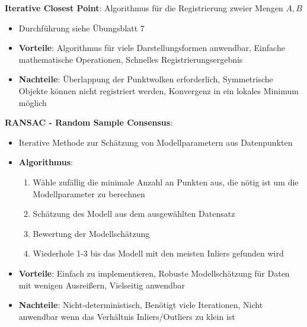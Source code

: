 \textbf{Iterative Closest Point}: Algorithmus für die Registrierung zweier Mengen $A,B$
\begin{itemize}
	\item Durchführung siehe Übungsblatt 7
	\item \textbf{Vorteile}: Algorithmus für viele Darstellungsformen anwendbar, Einfache mathematische Operationen, Schnelles Registrierungsergebnis
	\item \textbf{Nachteile}: Überlappung der Punktwolken erforderlich, Symmetrische Objekte können nicht registriert werden, Konvergenz in ein lokales Minimum möglich
\end{itemize}
\bigskip
\textbf{RANSAC - Random Sample Consensus}:
\begin{itemize}
	\item Iterative Methode zur Schätzung von Modellparametern aus Datenpunkten
	\item \textbf{Algorithmus}:
	\begin{enumerate}
		\item Wähle zufällig die minimale Anzahl an Punkten aus, die nötig ist um die Modellparameter zu berechnen
		\item Schätzung des Modell aus dem ausgewählten Datensatz
		\item Bewertung der Modellschätzung
		\item Wiederhole 1-3 bis das Modell mit den meisten Inliers gefunden wird
	\end{enumerate}
	\item \textbf{Vorteile}: Einfach zu implementieren, Robuste Modellschätzung für Daten mit wenigen Ausreißern, Vielseitig anwendbar
	\item \textbf{Nachteile}: Nicht-deterministisch, Benötigt viele Iterationen, Nicht anwendbar wenn das Verhältnis Inliers/Outliers zu klein ist
\end{itemize}
\pagebreak